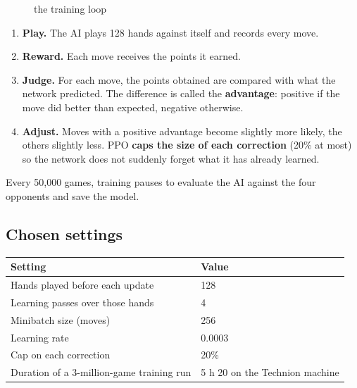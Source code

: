 \begin{figure}[H]\centering\caption{the training loop}\end{figure}

\begin{enumerate}

  \item \textbf{Play.} The AI plays 128 hands against itself and records every move.

  \item \textbf{Reward.} Each move receives the points it earned.

  \item \textbf{Judge.} For each move, the points obtained are compared with what the network predicted. The difference is called the \textbf{advantage}: positive if the move did better than expected, negative otherwise.

  \item \textbf{Adjust.} Moves with a positive advantage become slightly more likely, the others slightly less. PPO \textbf{caps the size of each correction} (20\% at most) so the network does not suddenly forget what it has already learned.

\end{enumerate}

Every 50,000 games, training pauses to evaluate the AI against the four opponents and save the model.

\subsection*{Chosen settings}

\begin{table}[htbp]\centering\small\begin{tabularx}{\linewidth}{Xl}\toprule

Setting & Value \\\midrule

Hands played before each update & 128 \\

Learning passes over those hands & 4 \\

Minibatch size (moves) & 256 \\

Learning rate & 0.0003 \\

Cap on each correction & 20\% \\

Duration of a 3-million-game training run & 5 h 20 on the Technion machine \\

\bottomrule\end{tabularx}\end{table}

